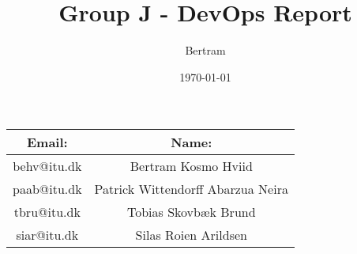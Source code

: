 \documentclass{article}
\title{Group J - DevOps Report}
\author{Bertram }
\date{\today}
\begin{document}
\maketitle
\begin{table}[h]
    \begin{center}
        \begin{tabular*}{1\textwidth}{c  c}
        \toprule
        Email: & Name: \\
        \midrule
        {behv@itu.dk} & {Bertram Kosmo Hviid} \\
        {paab@itu.dk} & {Patrick Wittendorff Abarzua Neira} \\
        {tbru@itu.dk} & {Tobias Skovbæk Brund} \\
        {siar@itu.dk} & {Silas Roien Arildsen} \\
        \bottomrule
        \end{tabular*}
    \end{center}
\end{table}

\newpage
\tableofcontents
\newpage




\newpage
\newpage

\end{document}
